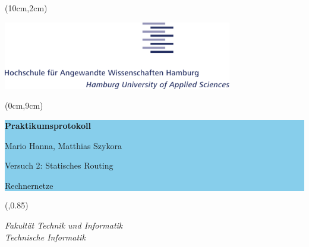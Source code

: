 \begin{titlepage}


 \def\theThesisAuthor{Mario Hanna, Matthias Szykora}
 \def\theThesisType{Praktikumsprotokoll}
 \def\theThesisTitle{Versuch 2: Statisches Routing}
 \def\theThesisSubTitle{Rechnernetze}
 
  \thispagestyle{empty}%
  \enlargethispage{\footskip}%
  \setlength{\parindent}{0em} %
  \sffamily %

  \begin{textblock*}{2cm}(10cm,2cm)
    \begin{minipage}[r]{\textwidth}%
      \if@haw@printer %
      \relax
      \else
      \includegraphics[width=10cm]{pic/logo}%
      \fi
    \end{minipage}%
  \end{textblock*}

  \begin{textblock*}{11cm}(0cm,9cm)
    \colorbox{SkyBlue}{%
      \begin{minipage}[l][10cm][c]{\paperwidth}%
        \hspace*{0.25\textwidth}
        \parbox[t]{0.7\textwidth}{%
          {\centering\bfseries\Huge\theThesisType

          \bigskip
          \Large\theThesisAuthor

          \vspace{2em}
          \theThesisTitle

          \bigskip
          \large\theThesisSubTitle\par
        }}%
      \end{minipage}%
    }
  \end{textblock*}



  \newlength{\xpos}
  \newlength{\fw}
  \setlength{\xpos}{1.5cm}
  \setlength{\fw}{\paperwidth}
  \addtolength{\fw}{-12\xpos}
  
  \begin{textblock*}{2cm}(\xpos,0.85\paperheight)
    \begin{minipage}[c]{\fw}
      \centering\newlength{\tw}
      \settowidth{\tw}{Studiendepartment Informations- und Elektrotechnik}
      \parbox[t]{\tw}{%
        \normalfont\itshape%
        Fakultät Technik und Informatik\\
        Technische Informatik
      }
    \end{minipage}
  \end{textblock*}

\null
\newpage

\end{titlepage}